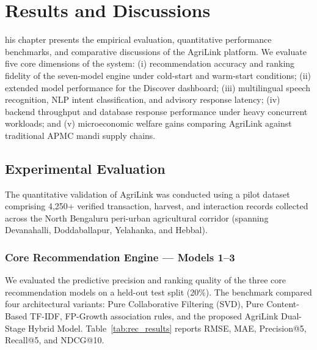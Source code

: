 \chapter{Results and Discussions}
\label{ch:Results}
his chapter presents the empirical evaluation, quantitative performance benchmarks, and comparative discussions of the AgriLink platform. We evaluate five core dimensions of the system: (i) recommendation accuracy and ranking fidelity of the seven-model engine under cold-start and warm-start conditions; (ii) extended model performance for the Discover dashboard; (iii) multilingual speech recognition, NLP intent classification, and advisory response latency; (iv) backend throughput and database response performance under heavy concurrent workloads; and (v) microeconomic welfare gains comparing AgriLink against traditional APMC mandi supply chains.

\section{Experimental Evaluation}
\label{sec:Res}
The quantitative validation of AgriLink was conducted using a pilot dataset comprising 4,250+ verified transaction, harvest, and interaction records collected across the North Bengaluru peri-urban agricultural corridor (spanning Devanahalli, Doddaballapur, Yelahanka, and Hebbal).

\subsection{Core Recommendation Engine --- Models 1--3}

We evaluated the predictive precision and ranking quality of the three core recommendation models on a held-out test split (20\%). The benchmark compared four architectural variants: Pure Collaborative Filtering (SVD), Pure Content-Based TF-IDF, FP-Growth association rules, and the proposed AgriLink Dual-Stage Hybrid Model. Table~\ref{tab:rec_results} reports RMSE, MAE, Precision@5, Recall@5, and NDCG@10.

